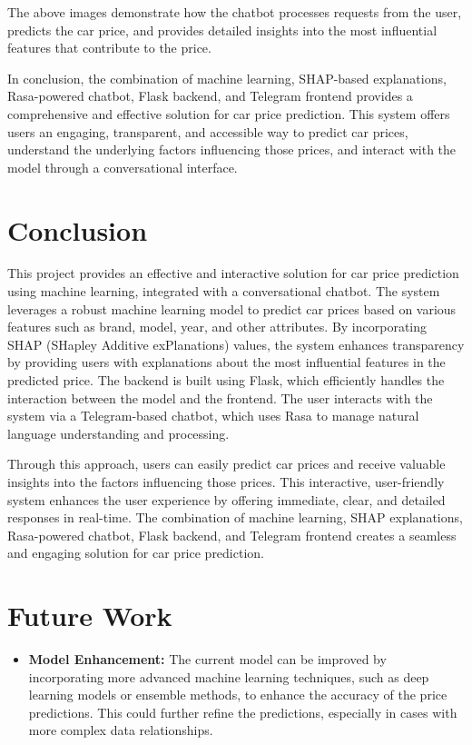 \documentclass[a4paper,12pt]{article}
\begin{document}
\begin{justify}
The above images demonstrate how the chatbot processes requests from the user, predicts the car price, and provides detailed insights into the most influential features that contribute to the price.

In conclusion, the combination of machine learning, SHAP-based explanations, Rasa-powered chatbot, Flask backend, and Telegram frontend provides a comprehensive and effective solution for car price prediction. This system offers users an engaging, transparent, and accessible way to predict car prices, understand the underlying factors influencing those prices, and interact with the model through a conversational interface.

\section{Conclusion}
This project provides an effective and interactive solution for car price prediction using machine learning, integrated with a conversational chatbot. The system leverages a robust machine learning model to predict car prices based on various features such as brand, model, year, and other attributes. By incorporating SHAP (SHapley Additive exPlanations) values, the system enhances transparency by providing users with explanations about the most influential features in the predicted price. The backend is built using Flask, which efficiently handles the interaction between the model and the frontend. The user interacts with the system via a Telegram-based chatbot, which uses Rasa to manage natural language understanding and processing.

Through this approach, users can easily predict car prices and receive valuable insights into the factors influencing those prices. This interactive, user-friendly system enhances the user experience by offering immediate, clear, and detailed responses in real-time. The combination of machine learning, SHAP explanations, Rasa-powered chatbot, Flask backend, and Telegram frontend creates a seamless and engaging solution for car price prediction.

\section{Future Work}
\begin{itemize}
	\item \textbf{Model Enhancement:} The current model can be improved by incorporating more advanced machine learning techniques, such as deep learning models or ensemble methods, to enhance the accuracy of the price predictions. This could further refine the predictions, especially in cases with more complex data relationships.
	

\end{itemize}
\end{justify}
\end{document}
